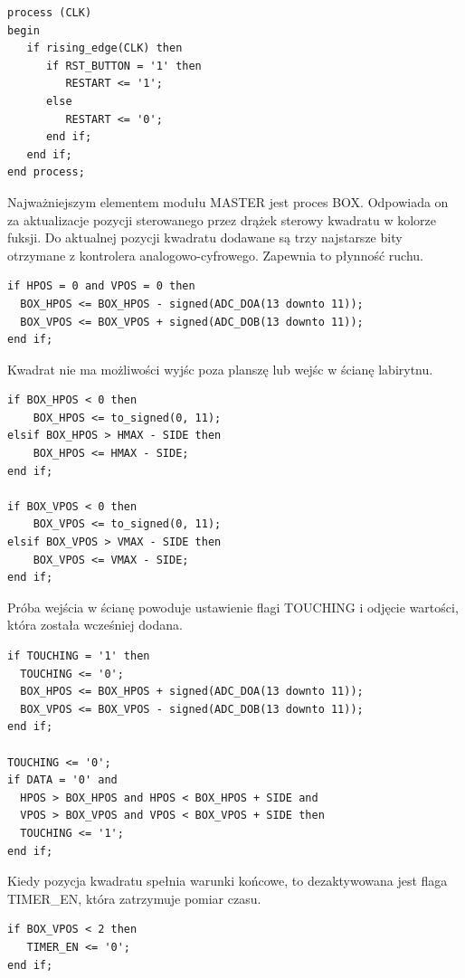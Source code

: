 \documentclass[11pt]{article}
\begin{document}
\begin{lstlisting}[caption=Sterowanie restartem]
process (CLK)
begin
   if rising_edge(CLK) then
      if RST_BUTTON = '1' then
         RESTART <= '1';
      else
         RESTART <= '0';
      end if;
   end if;
end process;
\end{lstlisting}

Najważniejszym elementem modułu MASTER jest proces BOX. 
Odpowiada on za aktualizacje pozycji sterowanego przez drążek sterowy kwadratu w kolorze fuksji.
Do aktualnej pozycji kwadratu dodawane są trzy najstarsze bity otrzymane z kontrolera analogowo-cyfrowego.
Zapewnia to płynność ruchu.
\newpage
\begin{lstlisting}[caption=Aktualizowanie pozycji kwadratu]
if HPOS = 0 and VPOS = 0 then
  BOX_HPOS <= BOX_HPOS - signed(ADC_DOA(13 downto 11));
  BOX_VPOS <= BOX_VPOS + signed(ADC_DOB(13 downto 11));
end if;
\end{lstlisting}


Kwadrat nie ma możliwości wyjśc poza planszę lub wejśc w ścianę labirytnu.

\begin{lstlisting}[caption=Zapobieganie wyścia poza mapę]
if BOX_HPOS < 0 then
    BOX_HPOS <= to_signed(0, 11);
elsif BOX_HPOS > HMAX - SIDE then
    BOX_HPOS <= HMAX - SIDE;
end if;

if BOX_VPOS < 0 then
    BOX_VPOS <= to_signed(0, 11);
elsif BOX_VPOS > VMAX - SIDE then
    BOX_VPOS <= VMAX - SIDE;
end if;
\end{lstlisting}

Próba wejścia w ścianę powoduje ustawienie flagi TOUCHING i odjęcie wartości, która została wcześniej dodana.

\begin{lstlisting}[caption=Przywracanie pozycji kwadratu]
if TOUCHING = '1' then
  TOUCHING <= '0';
  BOX_HPOS <= BOX_HPOS + signed(ADC_DOA(13 downto 11));
  BOX_VPOS <= BOX_VPOS - signed(ADC_DOB(13 downto 11));
end if;

TOUCHING <= '0';
if DATA = '0' and
  HPOS > BOX_HPOS and HPOS < BOX_HPOS + SIDE and 
  VPOS > BOX_VPOS and VPOS < BOX_VPOS + SIDE then
  TOUCHING <= '1';
end if;
\end{lstlisting}

Kiedy pozycja kwadratu spełnia warunki końcowe, to dezaktywowana jest flaga TIMER\_EN, która zatrzymuje pomiar czasu.

\begin{lstlisting}[caption=Zatrzymywanie pomiaru czasu]
if BOX_VPOS < 2 then
   TIMER_EN <= '0';
end if;
\end{lstlisting}
\end{document}
